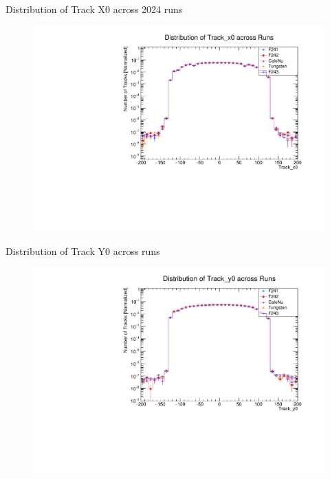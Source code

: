 \begin{frame}{Distribution of Track X0 across 2024 runs}
	\begin{figure}
		\includegraphics[width=\linewidth]{./RunwisePlots/Track_x0_runwise.pdf}
	\end{figure}
\end{frame}
\begin{frame}{Distribution of Track Y0 across runs}
	\begin{figure}
		\includegraphics[width=\linewidth]{./RunwisePlots/Track_y0_runwise.pdf}
	\end{figure}
\end{frame}

